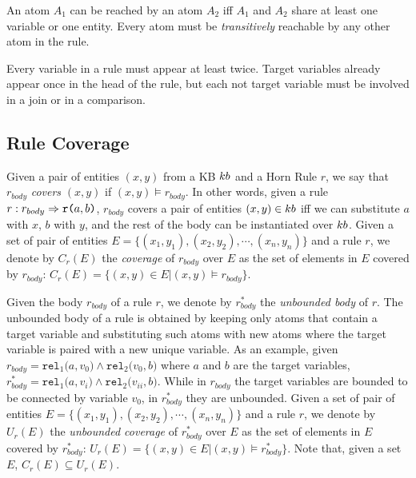  An atom $A_1$ can be reached by an atom $A_2$ iff $A_1$ and $A_2$ share at least one variable or one entity. 
Every atom must be \emph{transitively} reachable by any other atom in the rule.

 Every variable in a rule must appear at least twice. Target variables already appear once in the head of the rule, but
each not target variable must be involved in a join or in a comparison.  


\vspace{-1ex}
\subsection{Rule Coverage}
\vspace{-0.2ex}
Given a pair of entities $(x,y)$ from a KB ${\sc kb}$ and a Horn Rule $r$, we say that $r_{body}$ \emph{covers} $(x,y)$ if
$(x,y) \models r_{body}$. In other words, given a rule $r : r_{body} \Rightarrow \texttt{r(}a,b\texttt{)}$, $r_{body}$ covers a pair of entities $(x,y) \in {\sc kb}$ iff we can substitute $a$ with $x$, $b$ with $y$, and the rest of the body can be instantiated over ${\sc kb}$. Given a set of pair of entities $E = \{(x_1,y_1),(x_2,y_2),\cdots,(x_n,y_n)\}$ and a rule $r$, we denote by $C_r(E)$ the \emph{coverage} of $r_{body}$ over $E$ as the set of elements in $E$ covered by $r_{body}$: $C_r(E)=\{(x,y) \in E | (x,y) \models r_{body}\}$.

Given the body $r_{body}$ of a rule $r$, we denote by $r^{*}_{body}$ the \emph{unbounded body} of $r$. The unbounded body of a rule is obtained by keeping only atoms that contain a target variable and substituting such atoms with new atoms where the target variable is paired with a new unique variable. As an example, given $r_{body} = \texttt{rel}_1\texttt{(}a,v_0\texttt{)} \wedge \texttt{rel}_2\texttt{(}v_0,b\texttt{)}$ where $a$ and $b$ are the target variables, $r^{*}_{body} = \texttt{rel}_1\texttt{(}a,v_i\texttt{)} \wedge \texttt{rel}_2\texttt{(}v_{ii},b\texttt{)}$.
While in $r_{body}$ the target variables are bounded to be connected by variable $v_0$, in $r^{*}_{body}$ %
they are unbounded.
Given a set of pair of entities $E = \{(x_1,y_1),(x_2,y_2),\cdots,(x_n,y_n)\}$ and a rule $r$, we denote by $U_r(E)$ the \emph{unbounded coverage} of $r^{*}_{body}$ over $E$ as the set of elements in $E$ covered by $r^{*}_{body}$: $U_r(E)=\{(x,y) \in E | (x,y) \models r^{*}_{body}\}$. Note that, given a set $E$, $C_r(E) \subseteq U_r(E)$. 

